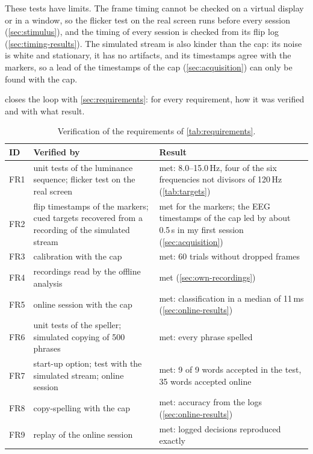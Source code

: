 These tests have limits. The frame timing cannot be checked on a virtual display or in
a window, so the flicker test on the real screen runs before every session
(\cref{sec:stimulus}), and the timing of every session is checked from its flip log
(\cref{sec:timing-results}). The simulated stream is also kinder than the cap: its
noise is white and stationary, it has no artifacts, and its timestamps agree with the
markers, so a lead of the timestamps of the cap (\cref{sec:acquisition}) can only be
found with the cap.

 closes the loop with \cref{sec:requirements}: for every
requirement, how it was verified and with what result.

\begin{table}[tb]
  \centering
  \caption{Verification of the requirements of \cref{tab:requirements}.}
  \label{tab:verification}
  \small
  \begin{tabularx}{\textwidth}{@{}l>{\raggedright\arraybackslash}X>{\raggedright\arraybackslash}X@{}}
    \toprule
    ID & Verified by & Result \\
    \midrule
    FR1  & unit tests of the luminance sequence; flicker test on the real screen & met: 8.0--15.0\,Hz, four of the six frequencies not divisors of 120\,Hz (\cref{tab:targets}) \\
    FR2  & flip timestamps of the markers; cued targets recovered from a recording of the simulated stream & met for the markers; the \acs*{EEG} timestamps of the cap led by about 0.5\,s in my first session (\cref{sec:acquisition}) \\
    FR3  & calibration with the cap & met: 60 trials without dropped frames \\
    FR4  & recordings read by the offline analysis & met (\cref{sec:own-recordings}) \\
    FR5  & online session with the cap & met: classification in a median of 11\,ms (\cref{sec:online-results}) \\
    FR6  & unit tests of the speller; simulated copying of 500 phrases & met: every phrase spelled \\
    FR7  & start-up option; test with the simulated stream; online session & met: 9 of 9 words accepted in the test, 35 words accepted online \\
    FR8  & copy-spelling with the cap & met: accuracy from the logs (\cref{sec:online-results}) \\
    FR9  & replay of the online session & met: logged decisions reproduced exactly \\

\end{tabularx}
\end{table}
